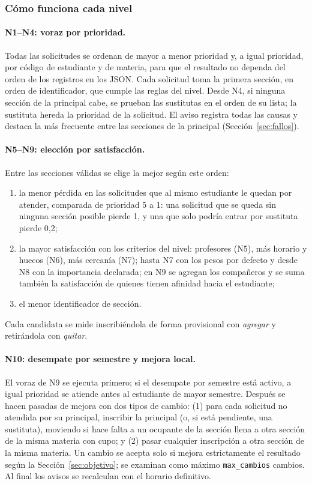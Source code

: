 \subsubsection{Cómo funciona cada nivel}

\paragraph{N1--N4: voraz por prioridad.} Todas las solicitudes se ordenan de mayor a menor prioridad y, a igual prioridad, por código de estudiante y de materia, para que el resultado no dependa del orden de los registros en los JSON. Cada solicitud toma la primera sección, en orden de identificador, que cumple las reglas del nivel. Desde N4, si ninguna sección de la principal cabe, se prueban las sustitutas en el orden de su lista; la sustituta hereda la prioridad de la solicitud. El aviso registra todas las causas y destaca la más frecuente entre las secciones de la principal (Sección~\ref{sec:fallos}).

\paragraph{N5--N9: elección por satisfacción.} Entre las secciones válidas se elige la mejor según este orden:
\begin{enumerate}
\item la menor pérdida en las solicitudes que al mismo estudiante le quedan por atender, comparada de prioridad 5 a 1: una solicitud que se queda sin ninguna sección posible pierde 1, y una que solo podría entrar por sustituta pierde 0,2;
\item la mayor satisfacción con los criterios del nivel: profesores (N5), más horario y huecos (N6), más cercanía (N7); hasta N7 con los pesos por defecto y desde N8 con la importancia declarada; en N9 se agregan los compañeros y se suma también la satisfacción de quienes tienen afinidad hacia el estudiante;
\item el menor identificador de sección.
\end{enumerate}
Cada candidata se mide inscribiéndola de forma provisional con \emph{agregar} y retirándola con \emph{quitar}.

\paragraph{N10: desempate por semestre y mejora local.} El voraz de N9 se ejecuta primero; si el desempate por semestre está activo, a igual prioridad se atiende antes al estudiante de mayor semestre. Después se hacen pasadas de mejora con dos tipos de cambio: (1) para cada solicitud no atendida por su principal, inscribir la principal (o, si está pendiente, una sustituta), moviendo si hace falta a un ocupante de la sección llena a otra sección de la misma materia con cupo; y (2) pasar cualquier inscripción a otra sección de la misma materia. Un cambio se acepta solo si mejora estrictamente el resultado según la Sección~\ref{sec:objetivo}; se examinan como máximo \texttt{max\_cambios} cambios. Al final los avisos se recalculan con el horario definitivo.

